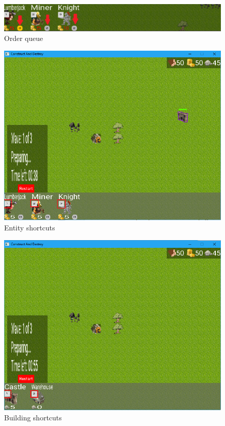 \begin{figure}[!htb]
    \centering
    \includegraphics[scale=0.8]{res/unit-panel-order-queue.png}
    \caption{Order queue}\label{fig:unit-panel-order-queue}
\end{figure}

\begin{figure}[!htb]
    \centering
    \includegraphics[scale=0.6]{res/entity-shortcuts.png}
    \caption{Entity shortcuts}\label{fig:entity-shortcuts}
\end{figure}

\begin{figure}[!htb]
    \centering
    \includegraphics[scale=0.6]{res/building-shortcuts.png}
    \caption{Building shortcuts}\label{fig:building-shortcuts}
\end{figure}

